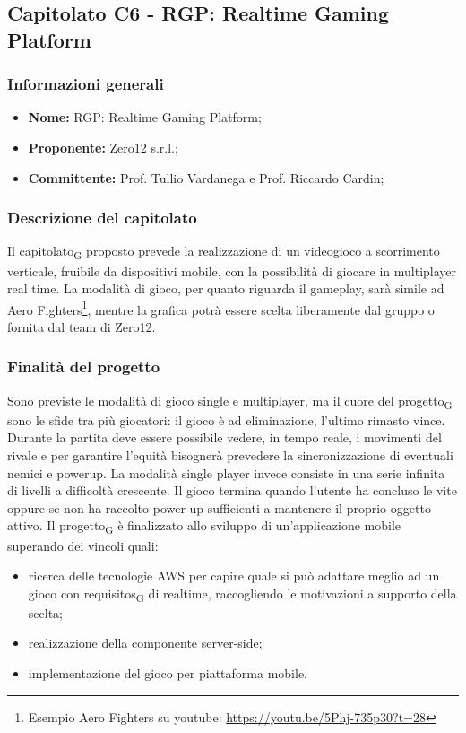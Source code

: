\subsection{Capitolato C6 - RGP: Realtime Gaming Platform}
\subsubsection{Informazioni generali}
	\begin{itemize}
	\item \textbf{Nome:} RGP: Realtime Gaming Platform;
	\item \textbf{Proponente:} Zero12 s.r.l.;
	\item \textbf{Committente:}  Prof. Tullio Vardanega e Prof. Riccardo Cardin;
	\end{itemize}
\subsubsection{Descrizione del capitolato}
    Il \gls{capitolato}\textsubscript{G} proposto prevede la realizzazione di un videogioco a scorrimento verticale, fruibile da dispositivi mobile, con la possibilità di giocare in multiplayer real time.
    La modalità di gioco, per quanto riguarda il gameplay, sarà simile ad Aero Fighters\footnote{Esempio Aero Fighters su youtube: \url{https://youtu.be/5Phj-735p30?t=28}}, mentre la grafica potrà essere scelta liberamente dal gruppo o fornita dal team di Zero12.

\subsubsection{Finalità del progetto}
    Sono previste le modalità di gioco single e multiplayer, ma
    il cuore del \gls{progetto}\textsubscript{G} sono le sfide tra più giocatori: il gioco è ad eliminazione, l'ultimo rimasto vince.
    Durante la partita deve essere possibile vedere, in tempo reale, i movimenti del rivale e per garantire l'equità bisognerà prevedere la sincronizzazione di eventuali nemici e powerup.
    La modalità single player invece consiste in una serie infinita di livelli a difficoltà crescente. Il gioco termina quando l'utente ha concluso le vite oppure se non ha raccolto power-up sufficienti a mantenere il proprio oggetto attivo.
    Il \gls{progetto}\textsubscript{G} è finalizzato allo sviluppo di un'applicazione mobile superando dei vincoli quali:
    \begin{itemize}
    	\item ricerca delle tecnologie AWS per capire quale si può adattare meglio ad un gioco con \glspl{requisito}\textsubscript{G} di realtime, raccogliendo le motivazioni a supporto della scelta;
    	\item realizzazione della componente server-side;
    	\item implementazione del gioco per piattaforma mobile.
    \end{itemize}
